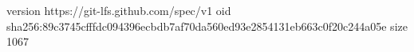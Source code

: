 version https://git-lfs.github.com/spec/v1
oid sha256:89c3745cfffdc094396ecbdb7af70da560ed93e2854131eb663c0f20c244a05e
size 1067
